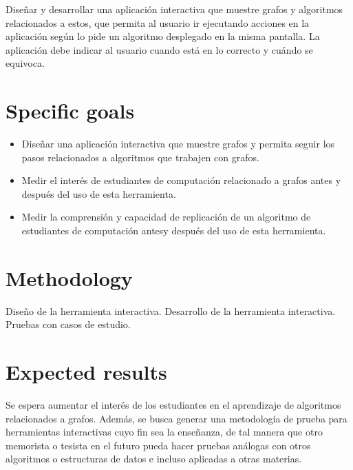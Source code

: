 \documentclass[submission]{eptcs}
\begin{document}
Diseñar y desarrollar una aplicación interactiva que muestre grafos y 
algoritmos relacionados a estos, que permita al usuario ir ejecutando
acciones en la aplicación según lo pide un algoritmo desplegado en la misma
pantalla. La aplicación debe indicar al usuario cuando está en lo correcto
y cuándo se equivoca.

\section{Specific goals}

\begin{itemize}
\item Diseñar una aplicación interactiva que muestre grafos y permita seguir
los pasos relacionados a algoritmos que trabajen con grafos.

\item Medir el interés de estudiantes de computación relacionado a grafos
antes y después del uso de esta herramienta.

\item Medir la comprensión y capacidad de replicación de un algoritmo de 
estudiantes de computación antesy después del uso de esta herramienta.


\end{itemize}

\section{Methodology}

Diseño de la herramienta interactiva.
Desarrollo de la herramienta interactiva.
Pruebas con casos de estudio.


\section{Expected results}

Se espera aumentar el interés de los estudiantes en el aprendizaje de algoritmos
relacionados a grafos. Además, se busca generar una metodología de prueba para
herramientas interactivas cuyo fin sea la enseñanza, de tal manera que otro
memorista o tesista en el futuro pueda hacer pruebas análogas con otros algoritmos
o estructuras de datos e incluso aplicadas a otras materias.

\nocite{*}


\end{document}
